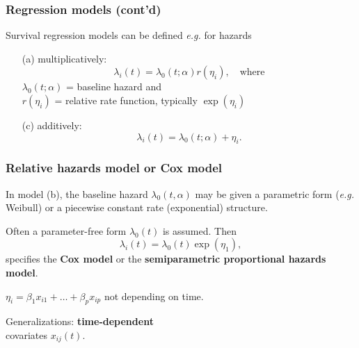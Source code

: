 \documentclass[handout,12pt,dvipsnames,t]{beamer}
\begin{document}
\begin{frame}
\frametitle{Regression models (cont'd)}
  
Survival regression models can be defined \textit{e.g.} for hazards 
\begin{itemize}
\item[(a)] multiplicatively: $$ 
\lambda_i(t) = \lambda_0(t; \alpha) r(\eta_i), \quad\text{where}$$
$\lambda_0(t; \alpha)$ = baseline hazard and \\
$r(\eta_i)$ = relative rate function, typically $\exp(\eta_i)$
\medskip
\pause
\item[(c)] additively: 
$$ \lambda_i(t) = \lambda_0(t; \alpha) + \eta_i. $$
\end{itemize}
\end{frame}




\begin{frame}
\frametitle{Relative hazards model or Cox model}

In model (b), the baseline hazard $\lambda_0(t,\alpha)$ may be given a parametric form (\textit{e.g.} Weibull) or
a piecewise constant rate (exponential) structure.

\bigskip
Often a parameter-free form $\lambda_0(t)$ is assumed. Then
\[
  \lambda_i(t) = \lambda_0(t) \exp(\eta_1),
\]
specifies the \textbf{Cox model} or the \textbf{semiparametric proportional hazards model}.

\bigskip
$\eta_i = \beta_1 x_{i1} + \dots + \beta_p x_{ip}$ not depending on time.  

\bigskip
Generalizations: \textbf{time-dependent} \\ covariates $x_{ij}(t)$.



\end{frame}
\end{document}
